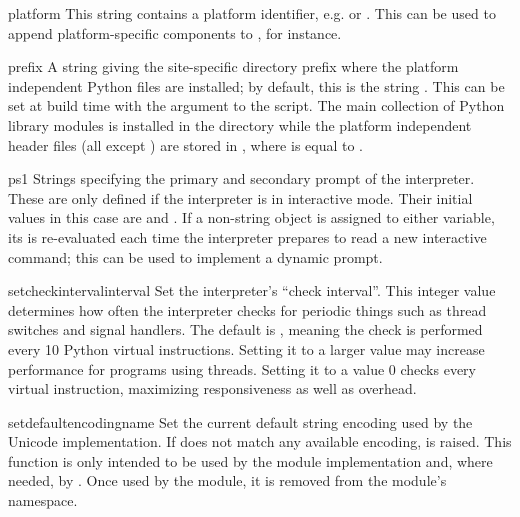 \begin{datadesc}{platform}
  This string contains a platform identifier, e.g.  or
  .  This can be used to append platform-specific
  components to , for instance.
\end{datadesc}

\begin{datadesc}{prefix}
  A string giving the site-specific directory prefix where the
  platform independent Python files are installed; by default, this is
  the string .  This can be set at build time with
  the  argument to the 
  script.  The main collection of Python library modules is installed
  in the directory  while
  the platform independent header files (all except )
  are stored in , where
   is equal to .
\end{datadesc}

\begin{datadesc}{ps1}
  Strings specifying the primary and secondary prompt of the
  interpreter.  These are only defined if the interpreter is in
  interactive mode.  Their initial values in this case are
   and .  If a non-string object is
  assigned to either variable, its  is re-evaluated
  each time the interpreter prepares to read a new interactive
  command; this can be used to implement a dynamic prompt.
\end{datadesc}

\begin{funcdesc}{setcheckinterval}{interval}
  Set the interpreter's ``check interval''.  This integer value
  determines how often the interpreter checks for periodic things such
  as thread switches and signal handlers.  The default is ,
  meaning the check is performed every 10 Python virtual instructions.
  Setting it to a larger value may increase performance for programs
  using threads.  Setting it to a value \code{<=} 0 checks every
  virtual instruction, maximizing responsiveness as well as overhead.
\end{funcdesc}

\begin{funcdesc}{setdefaultencoding}{name}
  Set the current default string encoding used by the Unicode
  implementation.  If  does not match any available
  encoding,  is raised.  This function is only
  intended to be used by the  module implementation
  and, where needed, by .  Once used by the
   module, it is removed from the 
  module's namespace.
\end{funcdesc}


